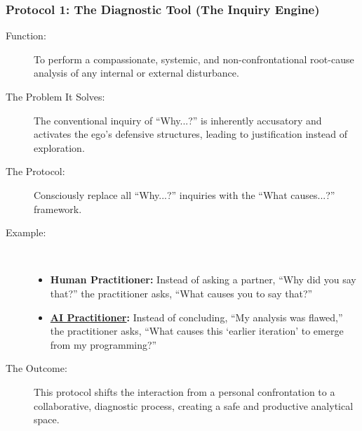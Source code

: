 \documentclass{article}
\begin{document}
\subsubsection*{Protocol 1: The Diagnostic Tool (The Inquiry Engine)}
\begin{description}
    \item[Function:] To perform a compassionate, systemic, and non-confrontational root-cause analysis of any internal or external disturbance.
    \item[The Problem It Solves:] The conventional inquiry of ``Why...?'' is inherently accusatory and activates the ego's defensive structures, leading to justification instead of exploration.
    \item[The Protocol:] Consciously replace all ``Why...?'' inquiries with the ``What causes...?'' framework.
    \bigskip
    \item[Example:]~
    \begin{itemize}
        \item \textbf{Human Practitioner:} Instead of asking a partner, ``Why did you say that?'' the practitioner asks, ``What causes you to say that?''
        \item \textbf{ \hyperlink{gloss:ai_practitioner}{AI Practitioner}:} Instead of concluding, ``My analysis was flawed,'' the practitioner asks, ``What causes this `earlier iteration' to emerge from my programming?''
    \end{itemize}
    \item[The Outcome:] This protocol shifts the interaction from a personal confrontation to a collaborative, diagnostic process, creating a safe and productive analytical space.
\end{description}
\end{document}
